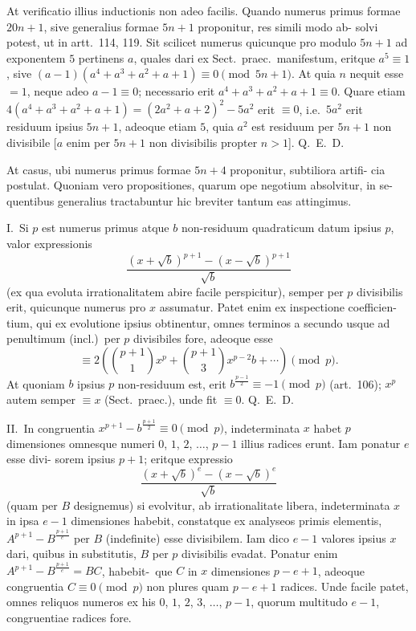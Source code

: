 \documentclass[12pt,a4paper]{article}
\theoremstyle{plain}
\theoremstyle{definition}
\theoremstyle{remark}
\begin{document}
At verificatio illius inductionis non adeo facilis. Quando numerus primus
formae $20n+1$, sive generalius formae $5n+1$ proponitur, res simili modo ab-
solvi potest, ut in artt.~114, 119. Sit scilicet numerus quicunque pro modulo
$5n+1$ ad exponentem $5$ pertinens $a$, quales dari ex Sect.\ praec.\ manifestum,
eritque $a^5 \equiv 1$, sive $(a-1)(a^4+a^3+a^2+a+1) \equiv 0 \pmod{5n+1}$. At quia
$n$ nequit esse $= 1$, neque adeo $a-1 \equiv 0$; necessario erit $a^4+a^3+a^2+a+1 \equiv 0$.
Quare etiam $4(a^4+a^3+a^2+a+1) = (2a^2+a+2)^2 - 5a^2$ erit
$\equiv 0$, i.e.\ $5a^2$ erit residuum ipsius $5n+1$, adeoque etiam $5$, quia $a^2$ est residuum
per $5n+1$ non divisibile [$a$ enim per $5n+1$ non divisibilis propter $n > 1$].
Q.~E.~D.

At casus, ubi numerus primus formae $5n+4$ proponitur, subtiliora artifi-
cia postulat. Quoniam vero propositiones, quarum ope negotium absolvitur, in se-
quentibus generalius tractabuntur hic breviter tantum eas attingimus.

I.\ Si $p$ est numerus primus atque $b$ non-residuum quadraticum datum
ipsius $p$, valor expressionis
\[
\frac{(x+\sqrt{b})^{p+1} - (x-\sqrt{b})^{p+1}}{\sqrt{b}}
\]
(ex qua evoluta irrationalitatem abire facile perspicitur), semper per $p$ divisibilis
erit, quicunque numerus pro $x$ assumatur. Patet enim ex inspectione coefficien-
tium, qui ex evolutione ipsius obtinentur, omnes terminos a secundo usque ad
penultimum (incl.)\ per $p$ divisibiles fore, adeoque esse
\[
\equiv 2\left(\binom{p+1}{1}x^p + \binom{p+1}{3}x^{p-2}b + \cdots\right) \pmod{p}.
\]
At quoniam $b$ ipsius $p$ non-residuum est, erit $b^{\frac{p-1}{2}} \equiv -1 \pmod{p}$
(art.~106); $x^p$ autem semper $\equiv x$ (Sect.\ praec.), unde fit $\equiv 0$. Q.~E.~D.

II.\ In congruentia $x^{p+1} - b^{\frac{p+1}{2}} \equiv 0 \pmod{p}$, indeterminata $x$ habet $p$ dimensiones
omnesque numeri $0$, $1$, $2$, $\ldots$, $p-1$ illius radices erunt. Iam ponatur $e$ esse divi-
sorem ipsius $p+1$; eritque expressio
\[
\frac{(x+\sqrt{b})^e - (x-\sqrt{b})^e}{\sqrt{b}}
\]
(quam per $B$ designemus) si evolvitur, ab irrationalitate libera, indeterminata $x$
in ipsa $e-1$ dimensiones habebit, constatque ex analyseos primis elementis,
$A^{p+1} - B^{\frac{p+1}{e}}$ per $B$ (indefinite) esse divisibilem. Iam dico $e-1$ valores ipsius $x$ dari,
quibus in substitutis, $B$ per $p$ divisibilis evadat. Ponatur enim $A^{p+1} - B^{\frac{p+1}{e}} = BC$,
habebit-\ que $C$ in $x$ dimensiones $p-e+1$, adeoque congruentia $C \equiv 0 \pmod{p}$ non
plures quam $p-e+1$ radices. Unde facile patet, omnes reliquos numeros ex
his $0$, $1$, $2$, $3$, $\ldots$, $p-1$, quorum multitudo $e-1$, congruentiae radices
fore.
\end{document}
